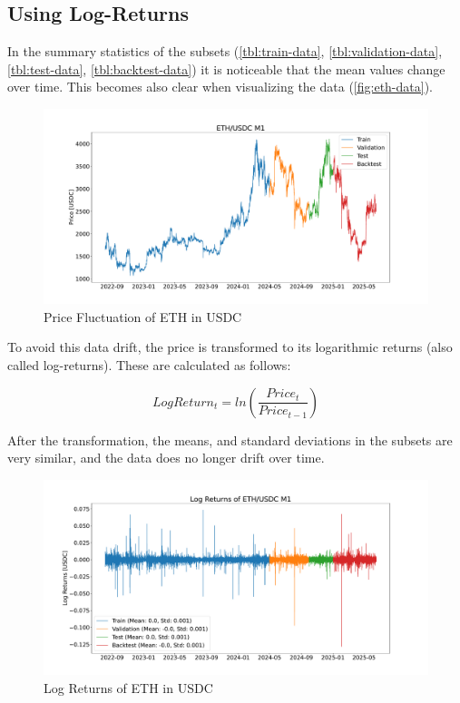 \subsection{Using Log-Returns}

In the summary statistics of the subsets (\autoref{tbl:train-data}, \autoref{tbl:validation-data}, \autoref{tbl:test-data}, \autoref{tbl:backtest-data}) it is noticeable that the mean values change over time.
This becomes also clear when visualizing the data (\autoref{fig:eth-data}).

\begin{figure}[H]
    \centering
    \includegraphics[width=\textwidth]{images/eda/ethusdc_price}
    \caption{Price Fluctuation of ETH in USDC}
    \label{fig:eth-data}
\end{figure}

To avoid this data drift, the price is transformed to its logarithmic returns (also called log-returns).
These are calculated as follows:

\begin{equation}
    LogReturn_t = ln(\frac{Price_t}{Price_{t-1}})
\end{equation}

After the transformation, the means, and standard deviations in the subsets are very similar, and the data does no longer drift over time.

\begin{figure}[H]
    \centering
    \includegraphics[width=\textwidth]{images/eda/log_returns_ethusdc}
    \caption{Log Returns of ETH in USDC}
    \label{fig:eth-log-data}
\end{figure}

